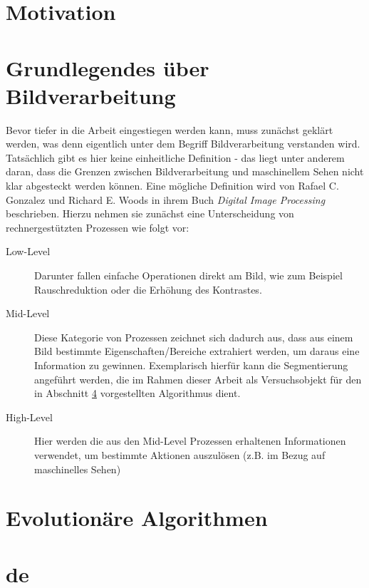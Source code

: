 \documentclass[10pt,a4paper,abstraction]{scrreprt}
\begin{document}
	\section{Motivation}
	\label{sec:motivation}
	
	\section{Grundlegendes über Bildverarbeitung}
	\label{sec:bild-basics}
	
	Bevor tiefer in die Arbeit eingestiegen werden kann, muss zunächst geklärt werden, was denn eigentlich unter dem Begriff Bildverarbeitung verstanden wird. Tatsächlich gibt es hier keine einheitliche Definition - das liegt unter anderem daran, dass die Grenzen zwischen Bildverarbeitung und maschinellem Sehen nicht klar abgesteckt werden können. Eine mögliche Definition wird von Rafael C. Gonzalez und Richard E. Woods in ihrem Buch \textit{Digital Image Processing} beschrieben. Hierzu nehmen sie zunächst eine Unterscheidung von rechnergestützten Prozessen wie folgt vor: \cite{gonzalez-woods-imgproc}
	\begin{description}
		\item[Low-Level] Darunter fallen einfache Operationen direkt am Bild, wie zum Beispiel Rauschreduktion oder die Erhöhung des Kontrastes.
		\item[Mid-Level] Diese Kategorie von Prozessen zeichnet sich dadurch aus, dass aus einem Bild bestimmte Eigenschaften/Bereiche extrahiert werden, um daraus eine Information zu gewinnen. Exemplarisch hierfür kann die Segmentierung angeführt werden, die im Rahmen dieser Arbeit als Versuchsobjekt für den in Abschnitt \ref{sec:de} vorgestellten Algorithmus dient.
		\item[High-Level] Hier werden die aus den Mid-Level Prozessen erhaltenen Informationen verwendet, um bestimmte Aktionen auszulösen (z.B. im Bezug auf maschinelles Sehen)
	\end{description}
	\section{Evolutionäre Algorithmen}
	\label{sec:evol}
	
	
	\section{\gls{de}}
	\label{sec:de}
\end{document}
